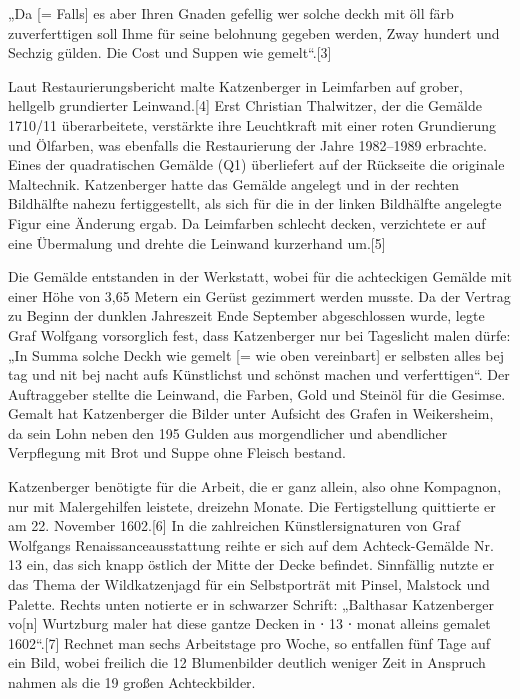 \documentclass[
  letterpaper,
]{book}
\begin{document}
„Da {[}= Falls{]} es aber Ihren Gnaden gefellig wer solche deckh mit öll
färb zuverferttigen soll Ihme für seine belohnung gegeben werden, Zway
hundert und Sechzig gülden. Die Cost und Suppen wie gemelt``.{[}3{]}

Laut Restaurierungsbericht malte Katzenberger in Leimfarben auf grober,
hellgelb grundierter Leinwand.{[}4{]} Erst Christian Thalwitzer, der die
Gemälde 1710/11 überarbeitete, verstärkte ihre Leuchtkraft mit einer
roten Grundierung und Ölfarben, was ebenfalls die Restaurierung der
Jahre 1982--1989 erbrachte. Eines der quadratischen Gemälde (Q1)
überliefert auf der Rückseite die originale Maltechnik. Katzenberger
hatte das Gemälde angelegt und in der rechten Bildhälfte nahezu
fertiggestellt, als sich für die in der linken Bildhälfte angelegte
Figur eine Änderung ergab. Da Leimfarben schlecht decken, verzichtete er
auf eine Übermalung und drehte die Leinwand kurzerhand um.{[}5{]}

Die Gemälde entstanden in der Werkstatt, wobei für die achteckigen
Gemälde mit einer Höhe von 3,65 Metern ein Gerüst gezimmert werden
musste. Da der Vertrag zu Beginn der dunklen Jahreszeit Ende September
abgeschlossen wurde, legte Graf Wolfgang vorsorglich fest, dass
Katzenberger nur bei Tageslicht malen dürfe: „In Summa solche Deckh wie
gemelt {[}= wie oben vereinbart{]} er selbsten alles bej tag und nit bej
nacht aufs Künstlichst und schönst machen und verferttigen``. Der
Auftraggeber stellte die Leinwand, die Farben, Gold und Steinöl für die
Gesimse. Gemalt hat Katzenberger die Bilder unter Aufsicht des Grafen in
Weikersheim, da sein Lohn neben den 195 Gulden aus morgendlicher und
abendlicher Verpflegung mit Brot und Suppe ohne Fleisch bestand.

Katzenberger benötigte für die Arbeit, die er ganz allein, also ohne
Kompagnon, nur mit Malergehilfen leistete, dreizehn Monate. Die
Fertigstellung quittierte er am 22. November 1602.{[}6{]} In die
zahlreichen Künstlersignaturen von Graf Wolfgangs Renaissanceausstattung
reihte er sich auf dem Achteck-Gemälde Nr. 13 ein, das sich knapp
östlich der Mitte der Decke befindet. Sinnfällig nutzte er das Thema der
Wildkatzenjagd für ein Selbstporträt mit Pinsel, Malstock und Palette.
Rechts unten notierte er in schwarzer Schrift: „Balthasar Katzenberger
vo{[}n{]} Wurtzburg maler hat diese gantze Decken in ⋅ 13 ⋅ monat
alleins gemalet 1602``.{[}7{]} Rechnet man sechs Arbeitstage pro Woche,
so entfallen fünf Tage auf ein Bild, wobei freilich die 12 Blumenbilder
deutlich weniger Zeit in Anspruch nahmen als die 19 großen
Achteckbilder.
\end{document}
